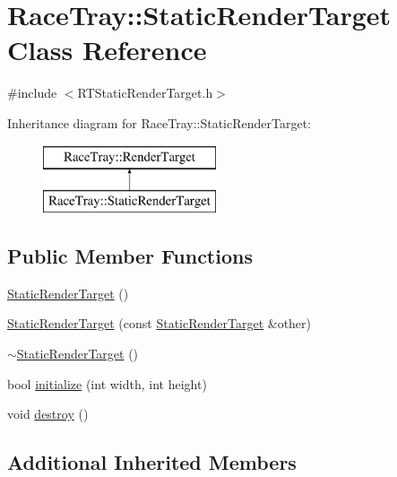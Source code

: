 \hypertarget{class_race_tray_1_1_static_render_target}{\section{Race\-Tray\-:\-:Static\-Render\-Target Class Reference}
\label{class_race_tray_1_1_static_render_target}
}


{\ttfamily \#include $<$R\-T\-Static\-Render\-Target.\-h$>$}

Inheritance diagram for Race\-Tray\-:\-:Static\-Render\-Target\-:\begin{figure}[H]
\begin{center}
\leavevmode
\includegraphics[height=2.000000cm]{class_race_tray_1_1_static_render_target}
\end{center}
\end{figure}
\subsection*{Public Member Functions}
\begin{DoxyCompactItemize}
\item 
\hyperlink{class_race_tray_1_1_static_render_target_aff3df5ac39783e29d0ec62746069d862}{Static\-Render\-Target} ()
\item 
\hyperlink{class_race_tray_1_1_static_render_target_a2443c361f8e5290e88d2380f2993a391}{Static\-Render\-Target} (const \hyperlink{class_race_tray_1_1_static_render_target}{Static\-Render\-Target} \&other)
\item 
\hyperlink{class_race_tray_1_1_static_render_target_a06a1218cf1df44e10dad99b132c2f316}{$\sim$\-Static\-Render\-Target} ()
\item 
bool \hyperlink{class_race_tray_1_1_static_render_target_a4f7bf1080af87d6b64e40771adac1861}{initialize} (int width, int height)
\item 
void \hyperlink{class_race_tray_1_1_static_render_target_a4f163966507ea68a0eccf7c3f5959bd3}{destroy} ()
\end{DoxyCompactItemize}
\subsection*{Additional Inherited Members}


